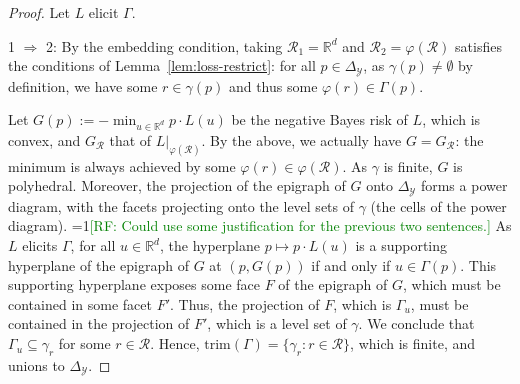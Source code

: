 \documentclass[anon,12pt]{colt2019}
\newcommand{\Comments}{1}
\newcommand{\mynote}[2]{\ifnum\Comments=1\textcolor{#1}{#2}\fi}
\newcommand{\raf}[1]{\mynote{green}{[RF: #1]}}
\newcommand{\reals}{\mathbb{R}}
\newcommand{\simplex}{\Delta_\Y}
\newcommand{\R}{\mathcal{R}}
\newcommand{\Y}{\mathcal{Y}}
\newcommand{\trim}{\mathrm{trim}}
\DeclareMathOperator*{\argmin}{arg\,min}
\begin{document}
\begin{proof}
  Let $L$ elicit $\Gamma$.

  1 $\Rightarrow$ 2:
  By the embedding condition, taking $\R_1 = \reals^d$ and $\R_2 = \varphi(\R)$ satisfies the conditions of Lemma~\ref{lem:loss-restrict}: for all $p\in\simplex$, as $\gamma(p) \neq \emptyset$ by definition, we have some $r\in\gamma(p)$ and thus some $\varphi(r) \in \Gamma(p)$.


  Let $G(p) := -\min_{u\in\reals^d} p\cdot L(u)$ be the negative Bayes risk of $L$, which is convex, and $G_{\R}$ that of $L|_{\varphi(\R)}$.
  By the above, we actually have $G = G_\R$: the minimum is always achieved by some $\varphi(r) \in \varphi(\R)$.
  As $\gamma$ is finite, $G$ is polyhedral.
  Moreover, the projection of the epigraph of $G$ onto $\simplex$ forms a power diagram, with the facets projecting onto the level sets of $\gamma$ (the cells of the power diagram).
  \raf{Could use some justification for the previous two sentences.}
  As $L$ elicits $\Gamma$, for all $u\in\reals^d$, the hyperplane $p\mapsto p\cdot L(u)$ is a supporting hyperplane of the epigraph of $G$ at $(p,G(p))$ if and only if $u\in\Gamma(p)$.
  This supporting hyperplane exposes some face $F$ of the epigraph of $G$, which must be contained in some facet $F'$.
  Thus, the projection of $F$, which is $\Gamma_u$, must be contained in the projection of $F'$, which is a level set of $\gamma$.
  We conclude that $\Gamma_u \subseteq \gamma_r$ for some $r\in\R$.
  Hence, $\trim(\Gamma) = \{\gamma_r : r\in\R\}$, which is finite, and unions to $\simplex$.


\end{proof}
\end{document}

